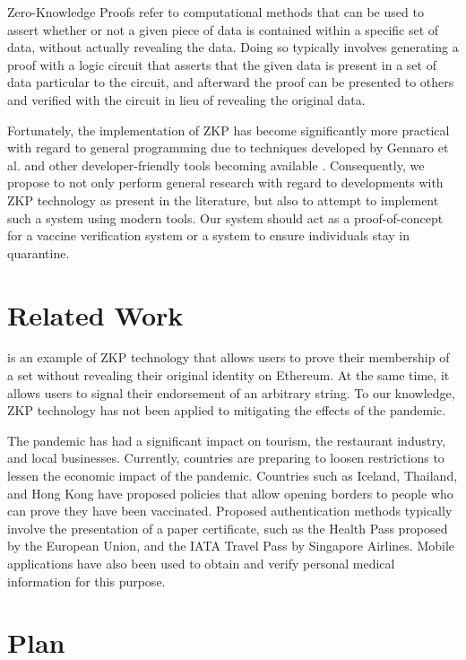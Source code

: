 \documentclass[sigconf, nonacm=true]{acmart}
\begin{document}
Zero-Knowledge Proofs refer to computational methods that can be used to assert whether or not a given piece of data is contained within a specific set of data, without actually revealing the data. Doing so typically involves generating a proof with a logic circuit that asserts that the given data is present in a set of data particular to the circuit, and afterward the proof can be presented to others and verified with the circuit in lieu of revealing the original data.

Fortunately, the implementation of ZKP has become significantly more practical with regard to general programming due to techniques developed by Gennaro et al. and other developer-friendly tools becoming available \cite{GGPR13}. Consequently, we propose to not only perform general research with regard to developments with ZKP technology as present in the literature, but also to attempt to implement such a system using modern tools. Our system should act as a proof-of-concept for a vaccine verification system or a system to ensure individuals stay in quarantine.

\section{Related Work}

 is an example of ZKP technology that allows users to prove their membership of a set without revealing their original identity on Ethereum. At the same time, it allows users to signal their endorsement of an arbitrary string. To our knowledge, ZKP technology has not been applied to mitigating the effects of the pandemic.

The pandemic has had a significant impact on tourism, the restaurant industry, and local businesses. Currently, countries are preparing to loosen restrictions to lessen the economic impact of the pandemic. Countries such as Iceland, Thailand, and Hong Kong have proposed policies that allow opening borders to people who can prove they have been vaccinated. Proposed authentication methods typically involve the presentation of a paper certificate, such as the Health Pass proposed by the European Union, and the IATA Travel Pass by Singapore Airlines. Mobile applications have also been used to obtain and verify personal medical information for this purpose.

\section{Plan}
\end{document}
